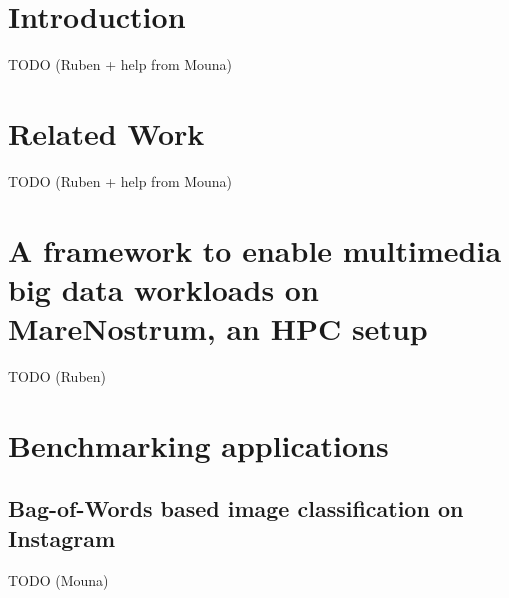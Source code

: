 \documentclass[smallextended]{svjour3}       %
\begin{document}
\section{Introduction}
\label{intro}

TODO (Ruben + help from Mouna)

\section{Related Work}
\label{sec:rw}

TODO (Ruben + help from Mouna)

\section{A framework to enable multimedia big data workloads on MareNostrum, an HPC setup}
\label{sec:spark4mn}

TODO (Ruben)

\section{Benchmarking applications}
\label{sec:exps1}

\subsection{Bag-of-Words based image classification on Instagram}

TODO (Mouna)
\end{document}
